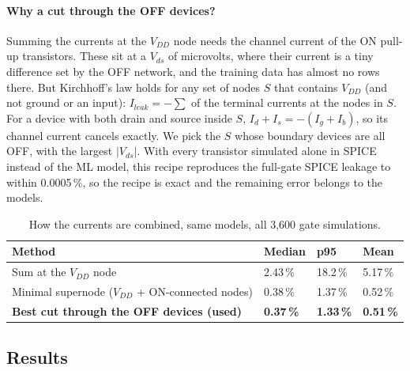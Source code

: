 \documentclass[11pt,a4paper]{article}
\newcommand{\pct}{\,\%}
\begin{document}
\paragraph{Why a cut through the OFF devices?} Summing the currents at the $V_{DD}$ node needs the
channel current of the ON pull-up transistors. These sit at a $V_{ds}$ of microvolts, where their
current is a tiny difference set by the OFF network, and the training data has almost no rows there.
But Kirchhoff's law holds for any set of nodes $S$ that contains $V_{DD}$ (and not ground or an
input): $I_{leak} = -\sum$ of the terminal currents at the nodes in $S$. For a device with both drain
and source inside $S$, $I_d + I_s = -(I_g + I_b)$, so its channel current cancels exactly. We pick
the $S$ whose boundary devices are all OFF, with the largest $|V_{ds}|$. With every transistor
simulated alone in SPICE instead of the ML model, this recipe reproduces the full-gate SPICE leakage
to within 0.0005\pct, so the recipe is exact and the remaining error belongs to the models.

\begin{table}[H]
\centering
\caption{How the currents are combined, same models, all 3,600 gate simulations.}
\label{tab:cut}
\begin{tabular}{llll}
\toprule
Method & Median & p95 & Mean \\
\midrule
Sum at the $V_{DD}$ node & 2.43\pct & 18.2\pct & 5.17\pct \\
Minimal supernode ($V_{DD}$ + ON-connected nodes) & 0.38\pct & 1.37\pct & 0.52\pct \\
\textbf{Best cut through the OFF devices (used)} & \textbf{0.37\pct} & \textbf{1.33\pct} & \textbf{0.51\pct} \\
\bottomrule
\end{tabular}
\end{table}

\subsection{Results}
\end{document}
